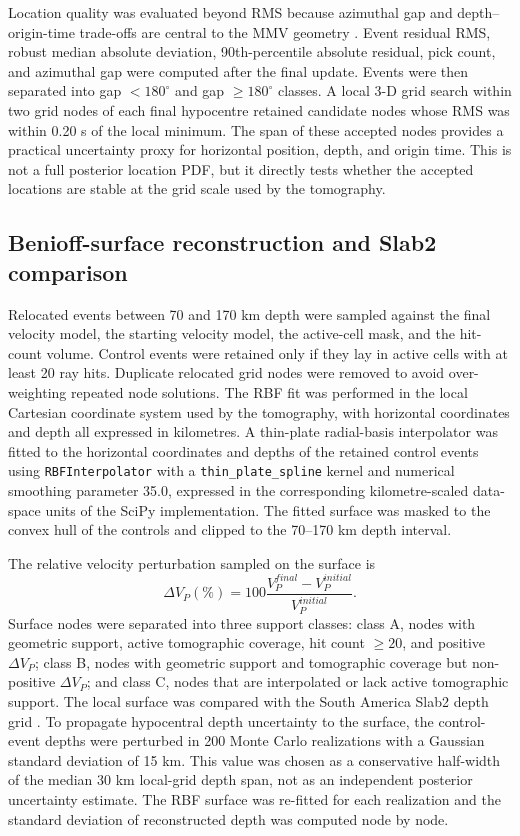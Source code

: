 \documentclass[review,authoryear]{elsarticle}
\begin{document}
Location quality was evaluated beyond RMS because azimuthal gap and depth--origin-time trade-offs are central to the MMV geometry \citep{HavskovOttemoller2010}. Event residual RMS, robust median absolute deviation, 90th-percentile absolute residual, pick count, and azimuthal gap were computed after the final update. Events were then separated into gap $<180^\circ$ and gap $\geq180^\circ$ classes. A local 3-D grid search within two grid nodes of each final hypocentre retained candidate nodes whose RMS was within 0.20 s of the local minimum. The span of these accepted nodes provides a practical uncertainty proxy for horizontal position, depth, and origin time. This is not a full posterior location PDF, but it directly tests whether the accepted locations are stable at the grid scale used by the tomography.

\subsection{Benioff-surface reconstruction and Slab2 comparison}
Relocated events between 70 and 170 km depth were sampled against the final velocity model, the starting velocity model, the active-cell mask, and the hit-count volume. Control events were retained only if they lay in active cells with at least 20 ray hits. Duplicate relocated grid nodes were removed to avoid over-weighting repeated node solutions. The RBF fit was performed in the local Cartesian coordinate system used by the tomography, with horizontal coordinates and depth all expressed in kilometres. A thin-plate radial-basis interpolator was fitted to the horizontal coordinates and depths of the retained control events using \texttt{RBFInterpolator} with a \texttt{thin\_plate\_spline} kernel and numerical smoothing parameter 35.0, expressed in the corresponding kilometre-scaled data-space units of the SciPy implementation. The fitted surface was masked to the convex hull of the controls and clipped to the 70--170 km depth interval.

The relative velocity perturbation sampled on the surface is
\begin{equation}
\Delta V_P(\%) = 100 \frac{V_P^{final}-V_P^{initial}}{V_P^{initial}} .
\label{eq:dvp}
\end{equation}
Surface nodes were separated into three support classes: class A, nodes with geometric support, active tomographic coverage, hit count $\geq20$, and positive $\Delta V_P$; class B, nodes with geometric support and tomographic coverage but non-positive $\Delta V_P$; and class C, nodes that are interpolated or lack active tomographic support. The local surface was compared with the South America Slab2 depth grid \citep{Hayes2018Slab2}. To propagate hypocentral depth uncertainty to the surface, the control-event depths were perturbed in 200 Monte Carlo realizations with a Gaussian standard deviation of 15 km. This value was chosen as a conservative half-width of the median 30 km local-grid depth span, not as an independent posterior uncertainty estimate. The RBF surface was re-fitted for each realization and the standard deviation of reconstructed depth was computed node by node.
\end{document}

